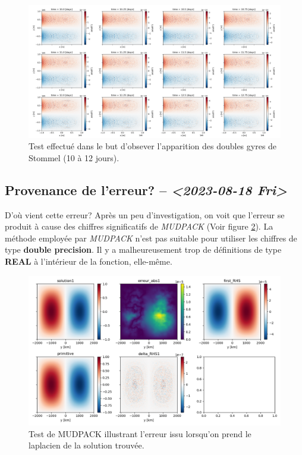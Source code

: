 \documentclass[10pt]{article}
\numberwithin{equation}{section}
\begin{document}
\begin{figure}[htbp]
\centering
\includegraphics[width=.9\linewidth]{figures/debuggage/2023_08_23_zetaBT_4filesperdays2.png}
\caption{\label{fig:org47d1bf4}Test effectué dans le but d'obsever l'apparition des doubles gyres de Stommel (10 à 12 jours).}
\end{figure}
\subsection{Provenance de l'erreur? -- \textit{<2023-08-18 Fri>}}
\label{sec:orgc033c71}
D'où vient cette erreur?
Après un peu d'investigation, on voit que l'erreur se produit à cause des chiffres significatifs de \emph{MUDPACK} (Voir figure \ref{fig:org7a285f8}).
La  méthode employée par \emph{MUDPACK} n'est pas suitable pour utiliser les chiffres de type \textbf{double precision}.
Il y a malheureusement trop de définitions de type \textbf{REAL} à l'intérieur de la fonction, elle-même.

\begin{figure}[htbp]
\centering
\includegraphics[width=.9\linewidth]{figures/MUDPACK/2023-08-23_MUDPACK_test_dirichlet.png}
\caption{\label{fig:org7a285f8}Test de MUDPACK illustrant l'erreur issu lorsqu'on prend le laplacien de la solution trouvée.}
\end{figure}
\end{document}
